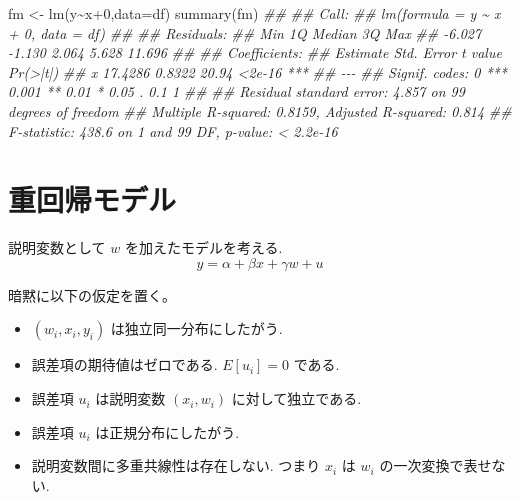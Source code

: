 \documentclass[
  letterpaper,
  xelatex,
  ja=standard, xelatex]{bxjsbook}
\newenvironment{Shaded}{\begin{snugshade}}{\end{snugshade}}
\newcommand{\AttributeTok}[1]{\textcolor[rgb]{0.40,0.45,0.13}{#1}}
\newcommand{\DecValTok}[1]{\textcolor[rgb]{0.68,0.00,0.00}{#1}}
\newcommand{\DocumentationTok}[1]{\textcolor[rgb]{0.37,0.37,0.37}{\textit{#1}}}
\newcommand{\FunctionTok}[1]{\textcolor[rgb]{0.28,0.35,0.67}{#1}}
\newcommand{\NormalTok}[1]{\textcolor[rgb]{0.00,0.23,0.31}{#1}}
\newcommand{\OtherTok}[1]{\textcolor[rgb]{0.00,0.23,0.31}{#1}}
\newcommand{\SpecialCharTok}[1]{\textcolor[rgb]{0.37,0.37,0.37}{#1}}
\providecommand{\tightlist}{%
  \setlength{\itemsep}{0pt}\setlength{\parskip}{0pt}}\usepackage{longtable,booktabs,array}
\begin{document}
\begin{Shaded}
\begin{Highlighting}[]
\NormalTok{fm }\OtherTok{\textless{}{-}} \FunctionTok{lm}\NormalTok{(y}\SpecialCharTok{\textasciitilde{}}\NormalTok{x}\SpecialCharTok{+}\DecValTok{0}\NormalTok{,}\AttributeTok{data=}\NormalTok{df)}
\FunctionTok{summary}\NormalTok{(fm)}
\DocumentationTok{\#\# }
\DocumentationTok{\#\# Call:}
\DocumentationTok{\#\# lm(formula = y \textasciitilde{} x + 0, data = df)}
\DocumentationTok{\#\# }
\DocumentationTok{\#\# Residuals:}
\DocumentationTok{\#\#    Min     1Q Median     3Q    Max }
\DocumentationTok{\#\# {-}6.027 {-}1.130  2.064  5.628 11.696 }
\DocumentationTok{\#\# }
\DocumentationTok{\#\# Coefficients:}
\DocumentationTok{\#\#   Estimate Std. Error t value Pr(\textgreater{}|t|)    }
\DocumentationTok{\#\# x  17.4286     0.8322   20.94   \textless{}2e{-}16 ***}
\DocumentationTok{\#\# {-}{-}{-}}
\DocumentationTok{\#\# Signif. codes:  0 \textquotesingle{}***\textquotesingle{} 0.001 \textquotesingle{}**\textquotesingle{} 0.01 \textquotesingle{}*\textquotesingle{} 0.05 \textquotesingle{}.\textquotesingle{} 0.1 \textquotesingle{} \textquotesingle{} 1}
\DocumentationTok{\#\# }
\DocumentationTok{\#\# Residual standard error: 4.857 on 99 degrees of freedom}
\DocumentationTok{\#\# Multiple R{-}squared:  0.8159, Adjusted R{-}squared:  0.814 }
\DocumentationTok{\#\# F{-}statistic: 438.6 on 1 and 99 DF,  p{-}value: \textless{} 2.2e{-}16}
\end{Highlighting}
\end{Shaded}

\section{重回帰モデル}\label{ux91cdux56deux5e30ux30e2ux30c7ux30eb}

説明変数として \(w\) を加えたモデルを考える. \[
y = \alpha + \beta x +\gamma w+ u
\]

暗黙に以下の仮定を置く。

\begin{itemize}
\tightlist
\item
  \((w_i, x_i,y_i)\) は独立同一分布にしたがう.
\item
  誤差項の期待値はゼロである. \(E[u_i]=0\) である.
\item
  誤差項 \(u_i\) は説明変数 \((x_i, w_i)\) に対して独立である.
\item
  誤差項 \(u_i\) は正規分布にしたがう.
\item
  説明変数間に多重共線性は存在しない. つまり \(x_i\) は \(w_i\)
  の一次変換で表せない.
\end{itemize}
\end{document}
